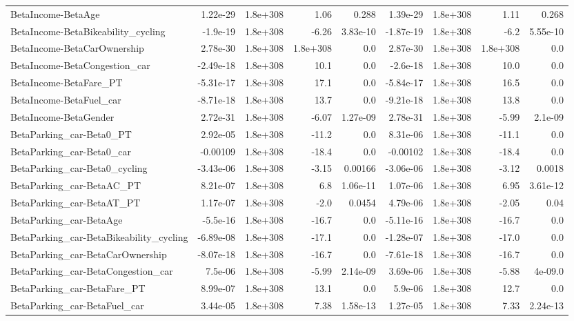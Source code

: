 \begin{tabular}{lrrrrrrrr}
BetaIncome-BetaAge & 1.22e-29 & 1.8e+308 & 1.06 & 0.288 & 1.39e-29 & 1.8e+308 & 1.11 & 0.268 \\
BetaIncome-BetaBikeability_cycling & -1.9e-19 & 1.8e+308 & -6.26 & 3.83e-10 & -1.87e-19 & 1.8e+308 & -6.2 & 5.55e-10 \\
BetaIncome-BetaCarOwnership & 2.78e-30 & 1.8e+308 & 1.8e+308 & 0.0 & 2.87e-30 & 1.8e+308 & 1.8e+308 & 0.0 \\
BetaIncome-BetaCongestion_car & -2.49e-18 & 1.8e+308 & 10.1 & 0.0 & -2.6e-18 & 1.8e+308 & 10.0 & 0.0 \\
BetaIncome-BetaFare_PT & -5.31e-17 & 1.8e+308 & 17.1 & 0.0 & -5.84e-17 & 1.8e+308 & 16.5 & 0.0 \\
BetaIncome-BetaFuel_car & -8.71e-18 & 1.8e+308 & 13.7 & 0.0 & -9.21e-18 & 1.8e+308 & 13.8 & 0.0 \\
BetaIncome-BetaGender & 2.72e-31 & 1.8e+308 & -6.07 & 1.27e-09 & 2.78e-31 & 1.8e+308 & -5.99 & 2.1e-09 \\
BetaParking_car-Beta0_PT & 2.92e-05 & 1.8e+308 & -11.2 & 0.0 & 8.31e-06 & 1.8e+308 & -11.1 & 0.0 \\
BetaParking_car-Beta0_car & -0.00109 & 1.8e+308 & -18.4 & 0.0 & -0.00102 & 1.8e+308 & -18.4 & 0.0 \\
BetaParking_car-Beta0_cycling & -3.43e-06 & 1.8e+308 & -3.15 & 0.00166 & -3.06e-06 & 1.8e+308 & -3.12 & 0.0018 \\
BetaParking_car-BetaAC_PT & 8.21e-07 & 1.8e+308 & 6.8 & 1.06e-11 & 1.07e-06 & 1.8e+308 & 6.95 & 3.61e-12 \\
BetaParking_car-BetaAT_PT & 1.17e-07 & 1.8e+308 & -2.0 & 0.0454 & 4.79e-06 & 1.8e+308 & -2.05 & 0.04 \\
BetaParking_car-BetaAge & -5.5e-16 & 1.8e+308 & -16.7 & 0.0 & -5.11e-16 & 1.8e+308 & -16.7 & 0.0 \\
BetaParking_car-BetaBikeability_cycling & -6.89e-08 & 1.8e+308 & -17.1 & 0.0 & -1.28e-07 & 1.8e+308 & -17.0 & 0.0 \\
BetaParking_car-BetaCarOwnership & -8.07e-18 & 1.8e+308 & -16.7 & 0.0 & -7.61e-18 & 1.8e+308 & -16.7 & 0.0 \\
BetaParking_car-BetaCongestion_car & 7.5e-06 & 1.8e+308 & -5.99 & 2.14e-09 & 3.69e-06 & 1.8e+308 & -5.88 & 4e-09.0 \\
BetaParking_car-BetaFare_PT & 8.99e-07 & 1.8e+308 & 13.1 & 0.0 & 5.9e-06 & 1.8e+308 & 12.7 & 0.0 \\
BetaParking_car-BetaFuel_car & 3.44e-05 & 1.8e+308 & 7.38 & 1.58e-13 & 1.27e-05 & 1.8e+308 & 7.33 & 2.24e-13 \\

\end{tabular}
